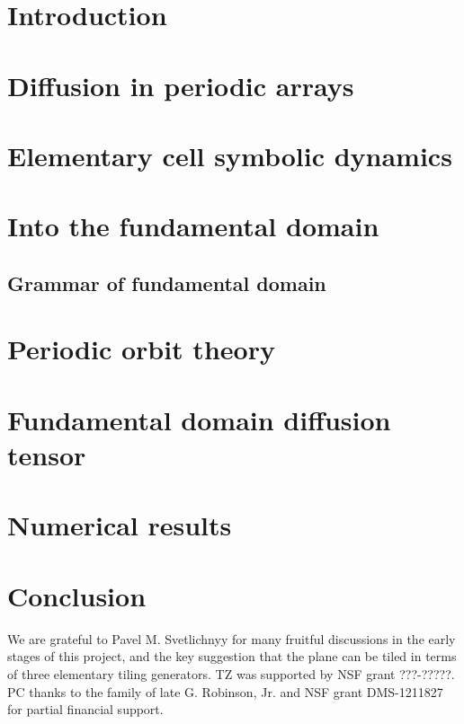 \documentclass[aps,pre,
                showpacs,
                twocolumn,
                groupedaddress,
                floatfix]{revtex4-1}
\begin{document}
\section{Introduction}
\label{s-intro}
  

\section{Diffusion in periodic arrays}
\label{s-Lorentz}
  

\section{Elementary cell symbolic dynamics}
\label{s-elemCell}
  

\section{Into the fundamental domain}
\label{s-fundDom}
  

\subsection{Grammar of fundamental domain}
\label{s-fundGramm}
  

\section{Periodic orbit theory}
\label{s-POT}
  

\section{Fundamental domain diffusion tensor}
\label{s-fundDiff}
  

\section{Numerical results}
\label{s-numerics}
  

\section{Conclusion}
\label{s-concl}
  

\begin{acknowledgments}
We are grateful to Pavel M. Svetlichnyy for many fruitful discussions in
the early stages of this project, and the key suggestion that the plane
can be tiled in terms of three elementary tiling generators.
TZ was supported by NSF grant ???-?????.
PC thanks to the family of late G. Robinson, Jr. and NSF grant
DMS-1211827 for partial financial support.
\end{acknowledgments}


% 


\ifboyscout
\eject  \newpage
    
\fi
\end{document}
